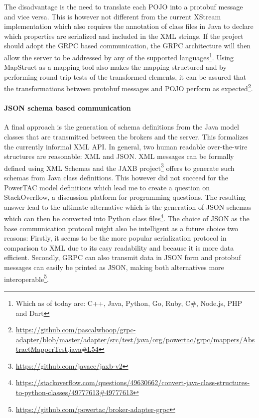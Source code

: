 The disadvantage is the need to translate each \ac{POJO} into a protobuf message and
vice versa. This is however not different from the current XStream implementation which also requires the annotation of
class files in Java to declare which properties are serialized and included in the \ac{XML} strings. If the project
should adopt the \ac{GRPC} based communication, the \ac{GRPC} architecture will then allow the server to be addressed by any of the supported languages\footnote{Which as of today are: C++, Java, Python, Go, Ruby, C\#, Node.js, PHP and
Dart}. Using MapStruct as a mapping tool also makes the mapping structured and by performing round trip tests of the
transformed elements, it can be assured that the transformations between protobuf messages and \ac{POJO} perform as
expected\footnote{\url{https://github.com/pascalwhoop/grpc-adapter/blob/master/adapter/src/test/java/org/powertac/grpc/mappers/AbstractMapperTest.java\#L54}}.



\paragraph{JSON schema based communication}%
\label{sub:json_schema_based_communication}


A final approach is the generation of schema definitions from the Java model classes that are transmitted between the
brokers and the server. This formalizes the currently informal \ac{XML} \ac{API}. In general, two human readable
over-the-wire structures are reasonable: \ac{XML} and \ac{JSON}.  \ac{XML} messages can be formally defined using
\ac{XML} Schemas and the \ac{JAXB} project\footnote{\url{https://github.com/javaee/jaxb-v2}} offers to generate such
schemas from Java class definitions. This however did not succeed for the \ac{PowerTAC} model definitions which lead me
to create a question on StackOverflow, a discussion platform for programming questions. The resulting answer lead to the
ultimate alternative which is the generation of \ac{JSON} schemas which can then be converted into Python class
files\footnote{\url{https://stackoverflow.com/questions/49630662/convert-java-class-structures-to-python-classes/49777613\#49777613}}.
The choice of \ac{JSON} as the base communication protocol might also be intelligent as a future choice two reasons:
Firstly, it seems to be the more popular serialization protocol in comparison to \ac{XML} \citep{jsonxml} due to its
easy readability and because it is more data efficient. Secondly, \ac{GRPC} can also transmit data in \ac{JSON} form and
protobuf messages can easily be printed as \ac{JSON}, making both alternatives more
interoperable\footnote{\url{https://github.com/powertac/broker-adapter-grpc} }.

